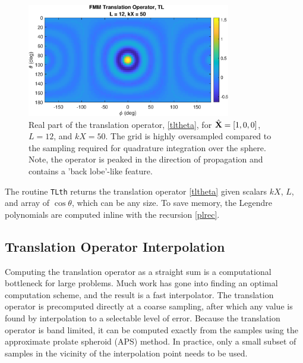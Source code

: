  \begin{figure}[h] 
   \centering
   \includegraphics[width=3.5in]{FastMultipoleMethod/Figures/TLtheta} 
   \caption{Real part of the translation operator, \eqref{tltheta}, for $\hat{\mathbf{X}} = [1, 0, 0]$, $L = 12$, and $kX = 50$. The grid is highly oversampled compared to the sampling required for quadrature integration over the sphere. Note, the operator is peaked in the direction of propagation and contains a 'back lobe'-like feature.}
   \label{}
\end{figure}



The routine \texttt{TLth} returns the translation operator \eqref{tltheta} given scalars $kX$, $L$, and array of $\cos\theta$, which can be any size. To save memory, the Legendre polynomials are computed inline with the recursion \eqref{plrec}.

{\footnotesize
{}
}



%
%
%
%

\subsection{Translation Operator Interpolation}

Computing the translation operator as a straight sum is a computational bottleneck for large problems.  Much work has gone into finding an optimal computation scheme, and the result is a fast interpolator.  The translation operator is precomputed directly at a coarse sampling, after which any value is found by interpolation to a selectable level of error.  Because the translation operator is band limited, it can be computed exactly from the samples using the approximate prolate spheroid (APS) method.  In practice, only a small subset of samples in the vicinity of the interpolation point needs to be used.  


